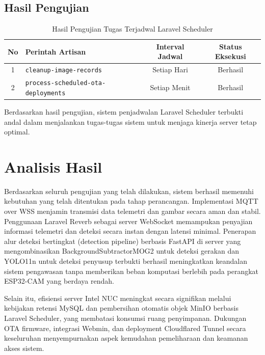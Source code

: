 \subsection{Hasil Pengujian}

\begin{table}[H]
	\centering
	\caption{Hasil Pengujian Tugas Terjadwal Laravel Scheduler}
	\begin{tabular}{|c|l|c|c|}
		\hline
		No & Perintah Artisan & Interval Jadwal & Status Eksekusi \\
		\hline
		1 & \texttt{cleanup-image-records} & Setiap Hari & Berhasil \\
		2 & \texttt{process-scheduled-ota-deployments} & Setiap Menit & Berhasil \\
		\hline
	\end{tabular}
\end{table}

Berdasarkan hasil pengujian, sistem penjadwalan Laravel Scheduler terbukti andal dalam menjalankan tugas-tugas sistem untuk menjaga kinerja server tetap optimal.

\section{Analisis Hasil}

Berdasarkan seluruh pengujian yang telah dilakukan, sistem berhasil memenuhi kebutuhan yang telah ditentukan pada tahap perancangan. Implementasi MQTT over WSS menjamin transmisi data telemetri dan gambar secara aman dan stabil. Penggunaan Laravel Reverb sebagai server WebSocket memampukan penyajian informasi telemetri dan deteksi secara instan dengan latensi minimal. Penerapan alur deteksi bertingkat (detection pipeline) berbasis FastAPI di server yang mengombinasikan BackgroundSubtractorMOG2 untuk deteksi gerakan dan YOLO11n untuk deteksi penyusup terbukti berhasil meningkatkan keandalan sistem pengawasan tanpa memberikan beban komputasi berlebih pada perangkat ESP32-CAM yang berdaya rendah.

Selain itu, efisiensi server Intel NUC meningkat secara signifikan melalui kebijakan retensi MySQL dan pembersihan otomatis objek MinIO berbasis Laravel Scheduler, yang membatasi konsumsi ruang penyimpanan. Dukungan OTA firmware, integrasi Webmin, dan deployment Cloudflared Tunnel secara keseluruhan menyempurnakan aspek kemudahan pemeliharaan dan keamanan akses sistem.